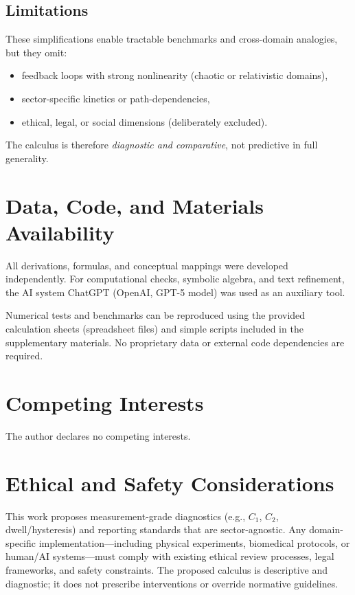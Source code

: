 \documentclass[12pt,a4paper,oneside]{scrreprt}
\begin{document}
\section*{Limitations}
These simplifications enable tractable benchmarks and cross-domain analogies, but they omit:
\begin{itemize}
\item feedback loops with strong nonlinearity (chaotic or relativistic domains),
\item sector-specific kinetics or path-dependencies,
\item ethical, legal, or social dimensions (deliberately excluded).
\end{itemize}
The calculus is therefore \emph{diagnostic and comparative}, not predictive in full generality.



\chapter*{Data, Code, and Materials Availability}

All derivations, formulas, and conceptual mappings were developed independently.
For computational checks, symbolic algebra, and text refinement, 
the AI system ChatGPT (OpenAI, GPT-5 model) was used as an auxiliary tool. 

Numerical tests and benchmarks can be reproduced using the provided calculation 
sheets (spreadsheet files) and simple scripts included in the supplementary materials. 
No proprietary data or external code dependencies are required.

\chapter*{Competing Interests}
The author declares no competing interests.

\chapter*{Ethical and Safety Considerations}
This work proposes measurement-grade diagnostics (e.g., $C_1$, $C_2$, dwell/hysteresis) 
and reporting standards that are sector-agnostic. 
Any domain-specific implementation---including physical experiments, biomedical protocols, 
or human/AI systems---must comply with existing ethical review processes, 
legal frameworks, and safety constraints. 
The proposed calculus is descriptive and diagnostic; 
it does not prescribe interventions or override normative guidelines.
\end{document}
